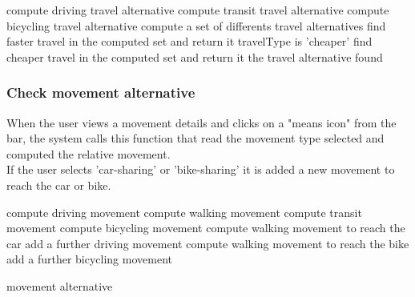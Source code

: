 \begin{algorithmic}

		
			\State 	compute driving travel alternative
			\State 	compute transit travel alternative
			\State 	compute bicycling travel alternative
			\State 	compute a set of differents travel alternatives
		\EndIf
				\State find faster travel in the computed set and return it
			\EndIf
			\If travelType is 'cheaper'
				\State find cheaper travel in the computed set and return it
			\EndIf
			\State \Return the travel alternative found
		\EndIf
	\EndFunction
\end{algorithmic}

\subsubsection{Check movement alternative}
\label{subsec:algMovementAlternative}
When the user views a movement details and clicks on a "means icon" from the bar, the system calls this function that read the movement type selected and computed the relative movement.	
\\ If the user selects 'car-sharing' or 'bike-sharing' it is added a new movement to reach the car or bike.

\begin{algorithmic}
			\State compute driving movement
			\State compute walking movement
			\State compute transit movement
			\State compute bicycling movement
			\State compute walking movement to reach the car
			\State add a further driving movement
			\State compute walking movement to reach the bike
			\State add a further bicycling movement
		\EndIf
	
			\State \Return movement alternative
		\EndIf
	\EndFunction

\end{algorithmic}

